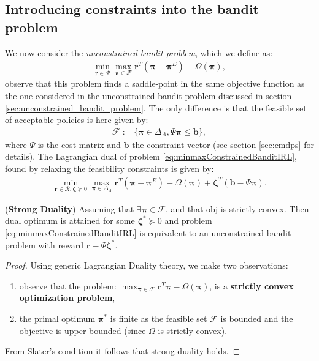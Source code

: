 \subsection{Introducing constraints into the bandit problem} \label{sec:constrained_bandit_problem}

We now consider the \textit{unconstrained bandit problem}, which we define as:
\begin{equation}
    \label{eq:minmaxConstrainedBanditIRL}
    \begin{aligned}
        \min_{\bm{r}\in\mathcal{R}}\max_{\bm{\pi}\in\mathcal{F}} \bm{r}^T(\bm{\pi}-\bm{\pi}^E)-\Omega(\bm{\pi}),
    \end{aligned}
\end{equation}
observe that this problem finds a saddle-point in the same objective function as the one considered in the unconstrained bandit problem discussed in section \ref{sec:unconstrained_bandit_problem}. The only difference is that the feasible set of acceptable policies is here given by:
\begin{align*}
    \mathcal{F} := \big\lbrace \bm{\pi} \in \Delta_A, \Psi \bm{\pi} \leq \bm{b} \big\rbrace,
\end{align*}
where $\Psi$ is the cost matrix and $\bm{b}$ the constraint vector (see section \ref{sec:cmdps} for details). The Lagrangian dual of problem \ref{eq:minmaxConstrainedBanditIRL}, found by relaxing the feasibility constraints is given by:
\begin{equation}
    \label{eq:dualConstrainedBanditIRL}
    \begin{aligned}
        \min_{\bm{r}\in\mathcal{R},\bm{\zeta} \succcurlyeq 0}\max_{\bm{\pi}\in\Delta_{A}} \bm{r}^T(\bm{\pi}-\bm{\pi}^E)-\Omega(\bm{\pi}) + \bm{\zeta}^T (\bm{b}-\Psi \bm{\pi}).
    \end{aligned}
\end{equation}
\begin{proposition}
    \label{prop:bandit_strong_duality}
    (\textbf{Strong Duality}) Assuming that $\exists \bm{\pi}\in\mathcal{F}$, and that $\text{obj}$ is strictly convex. Then dual optimum is attained for some $\bm{\zeta}^* \succcurlyeq 0$ and problem \ref{eq:minmaxConstrainedBanditIRL} is equivalent to an unconstrained bandit problem with reward $\bm{r}-\Psi \bm{\zeta}^*$. 
\end{proposition}
\begin{proof}
    Using generic Lagrangian Duality theory, we make two observations:
    \begin{enumerate}
        \item observe that the problem: $\max_{\bm{\pi} \in \mathcal{F}} \bm{r}^T \bm{\pi} - \Omega(\bm{\pi})$, is a \textbf{strictly convex optimization problem},
        \item the primal optimum $\bm{\pi}^*$ is finite as the feasible set $\mathcal{F}$ is bounded and the objective is upper-bounded (since $\Omega$ is strictly convex).
    \end{enumerate}
    From Slater's condition it follows that strong duality holds.
\end{proof}
